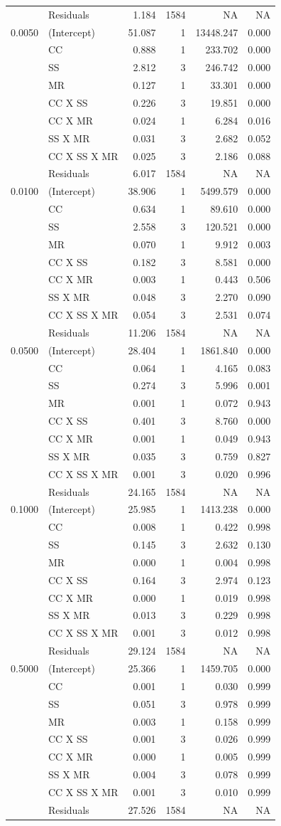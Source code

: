 \documentclass[]{article}
\theoremstyle{definition}
\theoremstyle{definition}
\theoremstyle{definition}
\theoremstyle{remark}
\begin{document}
\begin{longtable}[]{@{}llrrrr@{}}
& Residuals & 1.184 & 1584 & NA & NA\tabularnewline
0.0050 & (Intercept) & 51.087 & 1 & 13448.247 & 0.000\tabularnewline
& CC & 0.888 & 1 & 233.702 & 0.000\tabularnewline
& SS & 2.812 & 3 & 246.742 & 0.000\tabularnewline
& MR & 0.127 & 1 & 33.301 & 0.000\tabularnewline
& CC X SS & 0.226 & 3 & 19.851 & 0.000\tabularnewline
& CC X MR & 0.024 & 1 & 6.284 & 0.016\tabularnewline
& SS X MR & 0.031 & 3 & 2.682 & 0.052\tabularnewline
& CC X SS X MR & 0.025 & 3 & 2.186 & 0.088\tabularnewline
& Residuals & 6.017 & 1584 & NA & NA\tabularnewline
0.0100 & (Intercept) & 38.906 & 1 & 5499.579 & 0.000\tabularnewline
& CC & 0.634 & 1 & 89.610 & 0.000\tabularnewline
& SS & 2.558 & 3 & 120.521 & 0.000\tabularnewline
& MR & 0.070 & 1 & 9.912 & 0.003\tabularnewline
& CC X SS & 0.182 & 3 & 8.581 & 0.000\tabularnewline
& CC X MR & 0.003 & 1 & 0.443 & 0.506\tabularnewline
& SS X MR & 0.048 & 3 & 2.270 & 0.090\tabularnewline
& CC X SS X MR & 0.054 & 3 & 2.531 & 0.074\tabularnewline
& Residuals & 11.206 & 1584 & NA & NA\tabularnewline
0.0500 & (Intercept) & 28.404 & 1 & 1861.840 & 0.000\tabularnewline
& CC & 0.064 & 1 & 4.165 & 0.083\tabularnewline
& SS & 0.274 & 3 & 5.996 & 0.001\tabularnewline
& MR & 0.001 & 1 & 0.072 & 0.943\tabularnewline
& CC X SS & 0.401 & 3 & 8.760 & 0.000\tabularnewline
& CC X MR & 0.001 & 1 & 0.049 & 0.943\tabularnewline
& SS X MR & 0.035 & 3 & 0.759 & 0.827\tabularnewline
& CC X SS X MR & 0.001 & 3 & 0.020 & 0.996\tabularnewline
& Residuals & 24.165 & 1584 & NA & NA\tabularnewline
0.1000 & (Intercept) & 25.985 & 1 & 1413.238 & 0.000\tabularnewline
& CC & 0.008 & 1 & 0.422 & 0.998\tabularnewline
& SS & 0.145 & 3 & 2.632 & 0.130\tabularnewline
& MR & 0.000 & 1 & 0.004 & 0.998\tabularnewline
& CC X SS & 0.164 & 3 & 2.974 & 0.123\tabularnewline
& CC X MR & 0.000 & 1 & 0.019 & 0.998\tabularnewline
& SS X MR & 0.013 & 3 & 0.229 & 0.998\tabularnewline
& CC X SS X MR & 0.001 & 3 & 0.012 & 0.998\tabularnewline
& Residuals & 29.124 & 1584 & NA & NA\tabularnewline
0.5000 & (Intercept) & 25.366 & 1 & 1459.705 & 0.000\tabularnewline
& CC & 0.001 & 1 & 0.030 & 0.999\tabularnewline
& SS & 0.051 & 3 & 0.978 & 0.999\tabularnewline
& MR & 0.003 & 1 & 0.158 & 0.999\tabularnewline
& CC X SS & 0.001 & 3 & 0.026 & 0.999\tabularnewline
& CC X MR & 0.000 & 1 & 0.005 & 0.999\tabularnewline
& SS X MR & 0.004 & 3 & 0.078 & 0.999\tabularnewline
& CC X SS X MR & 0.001 & 3 & 0.010 & 0.999\tabularnewline
& Residuals & 27.526 & 1584 & NA & NA\tabularnewline
\bottomrule
\end{longtable}
\end{document}
